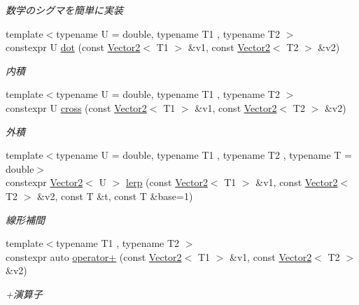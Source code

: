 \begin{DoxyCompactItemize}
\begin{DoxyCompactList}\small\item\em 数学のシグマを簡単に実装 \end{DoxyCompactList}\item 
{\footnotesize template$<$typename U  = double, typename T1 , typename T2 $>$ }\\constexpr U \mbox{\hyperlink{namespacesaki_a724d6c36d761314950d3ec8be6a4f4ab}{dot}} (const \mbox{\hyperlink{classsaki_1_1_vector2}{Vector2}}$<$ T1 $>$ \&v1, const \mbox{\hyperlink{classsaki_1_1_vector2}{Vector2}}$<$ T2 $>$ \&v2)
\begin{DoxyCompactList}\small\item\em 内積 \end{DoxyCompactList}\item 
{\footnotesize template$<$typename U  = double, typename T1 , typename T2 $>$ }\\constexpr U \mbox{\hyperlink{namespacesaki_ab3e7c6abdd4377486e393407283a492b}{cross}} (const \mbox{\hyperlink{classsaki_1_1_vector2}{Vector2}}$<$ T1 $>$ \&v1, const \mbox{\hyperlink{classsaki_1_1_vector2}{Vector2}}$<$ T2 $>$ \&v2)
\begin{DoxyCompactList}\small\item\em 外積 \end{DoxyCompactList}\item 
{\footnotesize template$<$typename U  = double, typename T1 , typename T2 , typename T  = double$>$ }\\constexpr \mbox{\hyperlink{classsaki_1_1_vector2}{Vector2}}$<$ U $>$ \mbox{\hyperlink{namespacesaki_a5fab9c2e4cffc4270b42004c4334c52a}{lerp}} (const \mbox{\hyperlink{classsaki_1_1_vector2}{Vector2}}$<$ T1 $>$ \&v1, const \mbox{\hyperlink{classsaki_1_1_vector2}{Vector2}}$<$ T2 $>$ \&v2, const T \&t, const T \&base=1)
\begin{DoxyCompactList}\small\item\em 線形補間 \end{DoxyCompactList}\item 
{\footnotesize template$<$typename T1 , typename T2 $>$ }\\constexpr auto \mbox{\hyperlink{namespacesaki_afa72a33da6ac050bfd8e91b9eae1422a}{operator+}} (const \mbox{\hyperlink{classsaki_1_1_vector2}{Vector2}}$<$ T1 $>$ \&v1, const \mbox{\hyperlink{classsaki_1_1_vector2}{Vector2}}$<$ T2 $>$ \&v2)
\begin{DoxyCompactList}\small\item\em +演算子 \end{DoxyCompactList}\item 

\end{DoxyCompactItemize}
